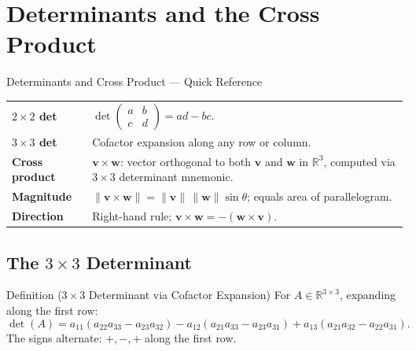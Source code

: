 
\section{Determinants and the Cross Product}

\begin{toolkitbox}{Determinants and Cross Product --- Quick Reference}
\begin{tabular}{@{}p{}p{}@{}}
\textbf{$2\times 2$ det}  & $\det\begin{pmatrix} a & b \\ c & d \end{pmatrix} = ad - bc$. \\[6pt]
\textbf{$3\times 3$ det}  & Cofactor expansion along any row or column. \\[4pt]
\textbf{Cross product}    & $\mathbf{v} \times \mathbf{w}$: vector orthogonal to both $\mathbf{v}$ and $\mathbf{w}$ in $\mathbb{R}^3$, computed via $3\times 3$ determinant mnemonic. \\[4pt]
\textbf{Magnitude}        & $\|\mathbf{v} \times \mathbf{w}\| = \|\mathbf{v}\|\,\|\mathbf{w}\|\sin\theta$; equals area of parallelogram. \\[4pt]
\textbf{Direction}        & Right-hand rule; $\mathbf{v} \times \mathbf{w} = -(\mathbf{w} \times \mathbf{v})$. \\
\end{tabular}
\end{toolkitbox}

\subsection*{The $3 \times 3$ Determinant}

\begin{propositionbox}{Definition ($3 \times 3$ Determinant via Cofactor Expansion)}
For $A \in \mathbb{R}^{3 \times 3}$, expanding along the first row:
\[
  \det(A) = a_{11}(a_{22}a_{33} - a_{23}a_{32})
           - a_{12}(a_{21}a_{33} - a_{23}a_{31})
           + a_{13}(a_{21}a_{32} - a_{22}a_{31}).
\]
The signs alternate: $+, -, +$ along the first row.
\end{propositionbox}


